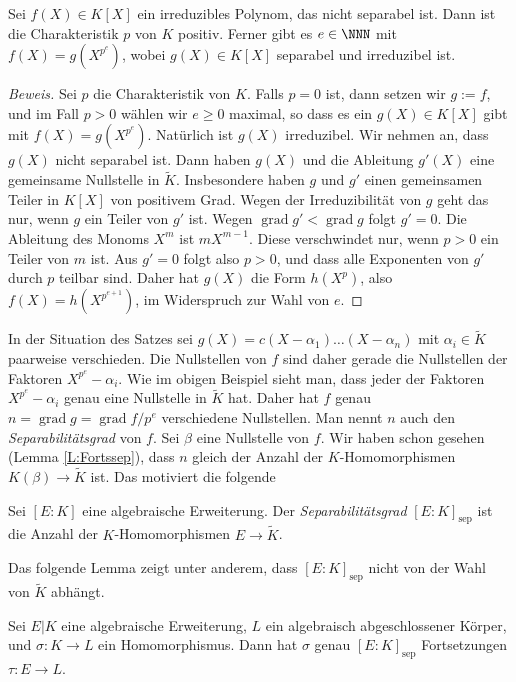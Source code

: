 \documentclass[12pt,a4paper,twoside]{article}
\newcommand{\ei}[1]{\emph{#1}\index{#1}}
\DeclareMathOperator{\grad}{grad}
\begin{document}
\begin{Satz}\label{S:inseppol}
  Sei $f(X)\in K[X]$ ein irreduzibles Polynom, das nicht separabel ist. Dann
  ist die Charakteristik $p$ von $K$ positiv. Ferner gibt es $e\in\NNN$ mit
  $f(X)=g(X^{p^e})$, wobei $g(X)\in K[X]$ separabel und irreduzibel ist.
\end{Satz}
\begin{proof}[Beweis]
  Sei $p$ die Charakteristik von $K$. Falls $p=0$ ist, dann setzen wir $g:=f$,
  und im Fall $p>0$ w\"ahlen wir $e\ge0$ maximal, so dass es ein $g(X)\in
  K[X]$ gibt mit $f(X)=g(X^{p^e})$.  Nat\"urlich ist $g(X)$ irreduzibel. Wir
  nehmen an, dass $g(X)$ nicht separabel ist. Dann haben $g(X)$ und die
  Ableitung $g'(X)$ eine gemeinsame Nullstelle in $\tilde K$. Insbesondere
  haben $g$ und $g'$ einen gemeinsamen Teiler in $K[X]$ von positivem Grad.
  Wegen der Irreduzibilit\"at von $g$ geht das nur, wenn $g$ ein Teiler von
  $g'$ ist. Wegen $\grad g'<\grad g$ folgt $g'=0$. Die Ableitung des Monoms
  $X^m$ ist $mX^{m-1}$. Diese verschwindet nur, wenn $p>0$ ein Teiler von $m$
  ist. Aus $g'=0$ folgt also $p>0$, und dass alle Exponenten von $g'$ durch
  $p$ teilbar sind. Daher hat $g(X)$ die Form $h(X^p)$, also
  $f(X)=h(X^{p^{e+1}})$, im Widerspruch zur Wahl von $e$.
\end{proof}
In der Situation des Satzes sei $g(X)=c(X-\alpha_1)\dots(X-\alpha_n)$ mit
$\alpha_i\in\tilde K$ paarweise verschieden. Die Nullstellen von $f$ sind
daher gerade die Nullstellen der Faktoren $X^{p^e}-\alpha_i$. Wie im obigen
Beispiel sieht man, dass jeder der Faktoren $X^{p^e}-\alpha_i$ genau eine
Nullstelle in $\tilde K$ hat. Daher hat $f$ genau $n=\grad g=\grad f/p^e$
verschiedene Nullstellen. Man nennt $n$ auch den \ei{Separabilit\"atsgrad} von
$f$. Sei $\beta$ eine Nullstelle von $f$.  Wir haben schon gesehen (Lemma
\ref{L:Fortssep}), dass $n$ gleich der Anzahl der $K$-Homomorphismen
$K(\beta)\to\tilde K$ ist. Das motiviert die folgende
\begin{Definition}
  Sei $[E:K]$ eine algebraische Erweiterung. Der \ei{Separabilit\"atsgrad}
  $[E:K]_\text{sep}$ ist die Anzahl der $K$-Homomorphismen $E\to\tilde K$.
\end{Definition}
Das folgende Lemma zeigt unter anderem, dass $[E:K]_\text{sep}$ nicht von der
Wahl von $\tilde K$ abh\"angt.
\begin{Lemma}
  Sei $E|K$ eine algebraische Erweiterung, $L$ ein algebraisch abgeschlossener
  K\"orper, und $\sigma:K\to L$ ein Homomorphismus. Dann hat $\sigma$ genau
  $[E:K]_\text{sep}$ Fortsetzungen $\tau:E\to L$.
\end{Lemma}
\end{document}
